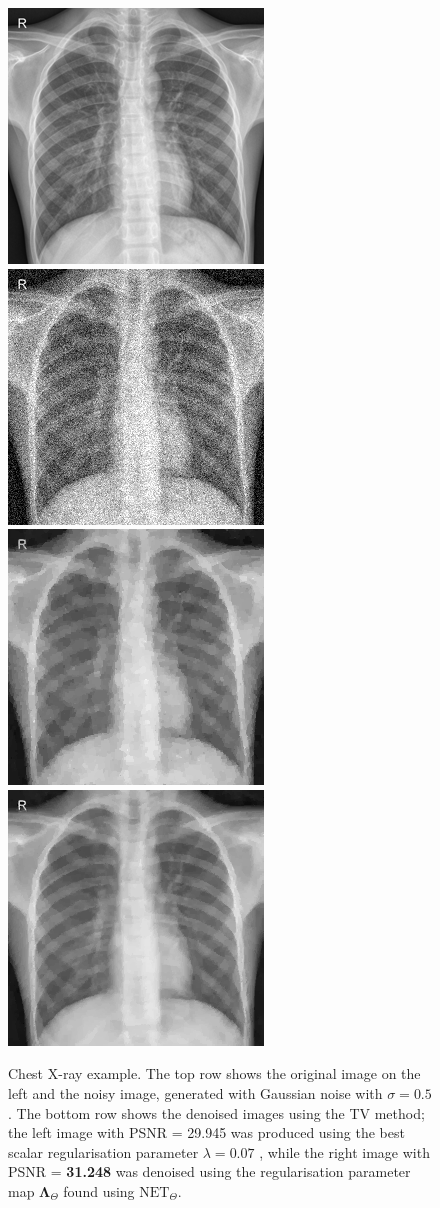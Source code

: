 \documentclass[12pt]{article}
\begin{document}
\begin{figure}[ht]
  \centering
  \includegraphics[width=0.34\linewidth]{images//chest_xray/ex_2/clean.png}
  \includegraphics[width=0.34\linewidth]{images//chest_xray/ex_2/noisy.png}
  \includegraphics[width=0.34\linewidth]{images//chest_xray/ex_2/psnr_29.945-lambda_0.07.png}
  \includegraphics[width=0.34\linewidth]{images//chest_xray/ex_2/denoised-mse_49.17-psnr_31.248-ssim_0.831.png}
  \caption{Chest X-ray example. The top row shows the original image on the left and the noisy image, generated with Gaussian noise with $\sigma = 0.5$. The bottom row shows the denoised images using the TV method; the left image with PSNR = 29.945 was produced using the best scalar regularisation parameter $\lambda = 0.07$ , while the right image with PSNR = \textbf{31.248} was denoised using the regularisation parameter map $\mathbf{\Lambda}_\Theta$ found using $\text{NET}_\Theta$.}
  \label{fig:enter-label}
\end{figure}
\end{document}
